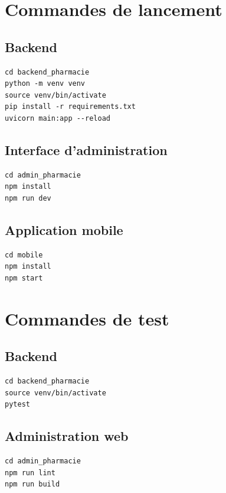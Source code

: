 \section{Commandes de lancement}

\subsection*{Backend}

\begin{lstlisting}
cd backend_pharmacie
python -m venv venv
source venv/bin/activate
pip install -r requirements.txt
uvicorn main:app --reload
\end{lstlisting}

\subsection*{Interface d'administration}

\begin{lstlisting}
cd admin_pharmacie
npm install
npm run dev
\end{lstlisting}

\subsection*{Application mobile}

\begin{lstlisting}
cd mobile
npm install
npm start
\end{lstlisting}

\section{Commandes de test}

\subsection*{Backend}

\begin{lstlisting}
cd backend_pharmacie
source venv/bin/activate
pytest
\end{lstlisting}

\subsection*{Administration web}

\begin{lstlisting}
cd admin_pharmacie
npm run lint
npm run build
\end{lstlisting}

